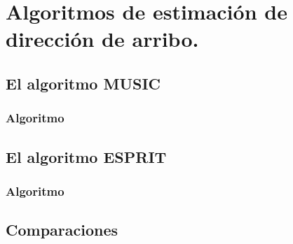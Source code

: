 \chapter{Algoritmos de estimación de dirección de arribo.}\label{ch:doaest}

\section{El algoritmo MUSIC}\label{subc:beamforming_MUSIC}

\subsection{Algoritmo}

\section{El algoritmo ESPRIT}\label{subc:beamforming_ESPRIT}
\subsection{Algoritmo}

\section{Comparaciones}\label{subc:beamforming_comparaciones}